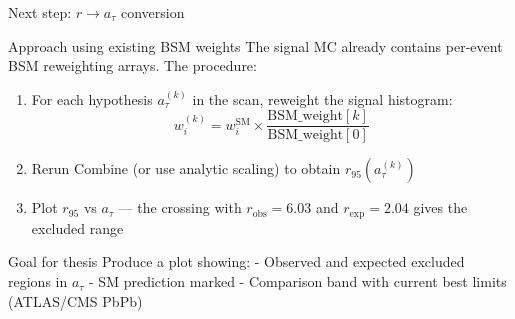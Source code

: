 \begin{frame}{Next step: \(r \to a_\tau\) conversion}
\protect{}\label{next-step-r-to-a_tau-conversion}
\begin{block}{Approach using existing BSM weights}
\protect{}\label{approach-using-existing-bsm-weights}
The signal MC already contains per-event BSM reweighting arrays. The
procedure:

\begin{enumerate}
\tightlist
\item
  For each hypothesis \(a_\tau^{(k)}\) in the scan, reweight the signal
  histogram:
  \[w_i^{(k)} = w_i^\text{SM} \times \frac{\text{BSM\_weight}[k]}{\text{BSM\_weight}[0]}\]
\item
  Rerun Combine (or use analytic scaling) to obtain
  \(r_{95}(a_\tau^{(k)})\)
\item
  Plot \(r_{95}\) vs \(a_\tau\) --- the crossing with
  \(r_\text{obs} = 6.03\) and \(r_\text{exp} = 2.04\) gives the excluded
  range
\end{enumerate}
\end{block}

\begin{block}{Goal for thesis}
\protect{}\label{goal-for-thesis}
Produce a plot showing: - Observed and expected excluded regions in
\(a_\tau\) - SM prediction marked - Comparison band with current best
limits (ATLAS/CMS PbPb)
\end{block}
\end{frame}

